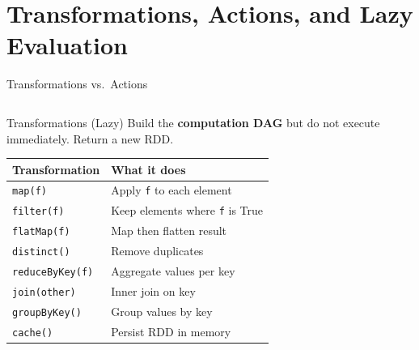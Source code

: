 \documentclass[aspectratio=169,10pt]{beamer}
\begin{document}
\section{Transformations, Actions, and Lazy Evaluation}

\begin{frame}{Transformations vs.\ Actions}
  \begin{columns}[T]
      \begin{block}{Transformations (Lazy)}
        Build the \textbf{computation DAG} but do not execute immediately.  Return a new RDD.
        \vspace{4pt}
        \renewcommand{\arraystretch}{1.2}
        \begin{tabular}{p{2.0cm}p{3.5cm}}
          \toprule
          \textbf{Transformation} & \textbf{What it does} \\
          \midrule
          \texttt{map(f)}     & Apply \texttt{f} to each element \\
          \texttt{filter(f)}  & Keep elements where \texttt{f} is True \\
          \texttt{flatMap(f)} & Map then flatten result \\
          \texttt{distinct()} & Remove duplicates \\
          \texttt{reduceByKey(f)} & Aggregate values per key \\
          \texttt{join(other)} & Inner join on key \\
          \texttt{groupByKey()} & Group values by key \\
          \texttt{cache()}    & Persist RDD in memory \\
          \bottomrule
        \end{tabular}
      \end{block}


\end{columns}
\end{frame}
\end{document}
